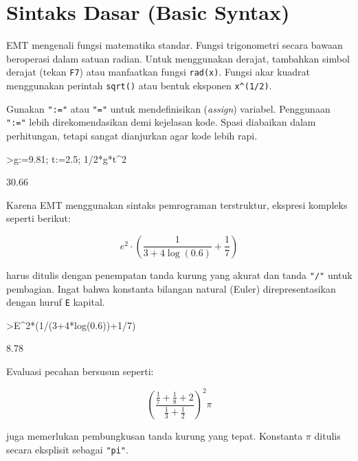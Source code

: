 \documentclass[a4paper,11pt,oneside,enabledeprecatedfontcommands]{scrbook}
\newenvironment{eulernotebook}{}{}
\newcommand{\eulersubheading}[1]{\section{#1}}
\newenvironment{eulercomment}{\par\medskip\noindent}{\par\medskip}
\newenvironment{eulerformula}{}{}
\begin{document}
\begin{eulernotebook}
\eulersubheading{Sintaks Dasar (Basic Syntax)}
\begin{eulercomment}
EMT mengenali fungsi matematika standar. Fungsi trigonometri secara bawaan beroperasi dalam satuan radian. Untuk menggunakan derajat, tambahkan simbol derajat (tekan \texttt{F7}) atau manfaatkan fungsi \texttt{rad(x)}. Fungsi akar kuadrat menggunakan perintah \texttt{sqrt()} atau bentuk eksponen \texttt{x\textasciicircum{}(1/2)}.

Gunakan \texttt{":="} atau \texttt{"="} untuk mendefinisikan (\emph{assign}) variabel. Penggunaan \texttt{":="} lebih direkomendasikan demi kejelasan kode. Spasi diabaikan dalam perhitungan, tetapi sangat dianjurkan agar kode lebih rapi.
\end{eulercomment}
\begin{eulerprompt}
>g:=9.81; t:=2.5; 1/2*g*t^2
\end{eulerprompt}
\begin{euleroutput}
      30.66 
\end{euleroutput}
\begin{eulercomment}
Karena EMT menggunakan sintaks pemrograman terstruktur, ekspresi kompleks seperti berikut:
\end{eulercomment}
\begin{eulerformula}
\[
e^2 \cdot \left( \frac{1}{3+4 \log(0.6)}+\frac{1}{7} \right)
\]
\end{eulerformula}
\begin{eulercomment}
harus ditulis dengan penempatan tanda kurung yang akurat dan tanda \texttt{"/"} untuk pembagian. Ingat bahwa konstanta bilangan natural (Euler) direpresentasikan dengan huruf \texttt{E} kapital.
\end{eulercomment}
\begin{eulerprompt}
>E^2*(1/(3+4*log(0.6))+1/7)
\end{eulerprompt}
\begin{euleroutput}
       8.78 
\end{euleroutput}
\begin{eulercomment}
Evaluasi pecahan bersusun seperti:
\end{eulercomment}
\begin{eulerformula}
\[
\left(\frac{\frac17 + \frac18 + 2}{\frac13 + \frac12}\right)^2 \pi
\]
\end{eulerformula}
\begin{eulercomment}
juga memerlukan pembungkusan tanda kurung yang tepat. Konstanta $\pi$ ditulis secara eksplisit sebagai \texttt{"pi"}.
\end{eulercomment}

\end{eulernotebook}
\end{document}
